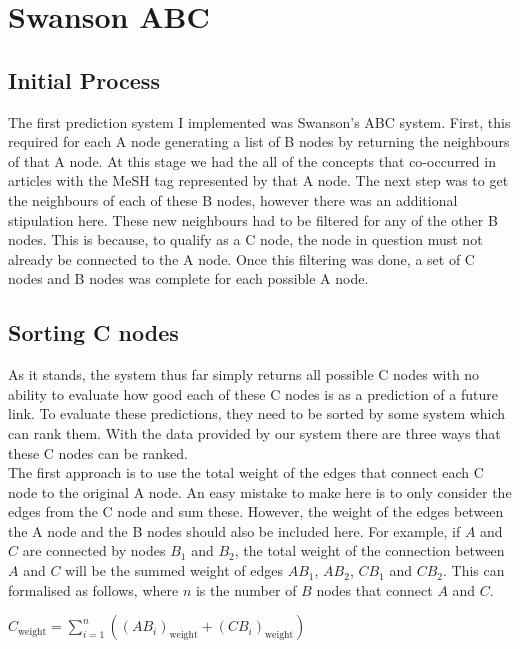 \documentclass{l4proj}
\begin{document}
\section{Swanson ABC}

\subsection{Initial Process}

The first prediction system I implemented was Swanson's ABC system. First, this required for each A node generating a list of B nodes by returning the neighbours of that A node. At this stage we had the all of the concepts that co-occurred in articles with the MeSH tag represented by that A node. The next step was to get the neighbours of each of these B nodes, however there was an additional stipulation here. These new neighbours had to be filtered for any of the other B nodes. This is because, to qualify as a C node, the node in question must not already be connected to the A node. Once this filtering was done, a set of C nodes and B nodes was complete for each possible A node. \\

\subsection{Sorting C nodes}

As it stands, the system thus far simply returns all possible C nodes with no ability to evaluate how good each of these C nodes is as a prediction of a future link. To evaluate these predictions, they need to be sorted by some system which can rank them. With the data provided by our system there are three ways that these C nodes can be ranked. \\

The first approach is to use the total weight of the edges that connect each C node to the original A node. An easy mistake to make here is to only consider the edges from the C node and sum these. However, the weight of the edges between the A node and the B nodes should also be included here. For example, if $A$ and $C$ are connected by nodes $B_1$ and $B_2$, the total weight of the connection between $A$ and $C$ will be the summed weight of edges $AB_1$, $AB_2$, $CB_1$ and $CB_2$. This can formalised as follows, where $n$ is the number of $B$ nodes that connect $A$ and $C$.
\begin{center}
    $C_{\text{weight}} = \sum_{i=1}^n ((AB_i)_{\text{weight}} + (CB_i)_{\text{weight}})$ \\
\end{center}
\end{document}
